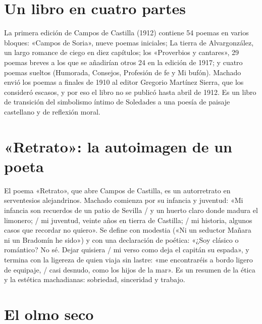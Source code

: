 \documentclass{book}
\begin{document}

\section{Un libro en cuatro partes}

La primera edición de Campos de Castilla (1912) contiene 54 poemas en varios bloques: «Campos de Soria», nueve poemas iniciales; La tierra de Alvargonzález, un largo romance de ciego en diez capítulos; los «Proverbios y cantares», 29 poemas breves a los que se añadirían otros 24 en la edición de 1917; y cuatro poemas sueltos (Humorada, Consejos, Profesión de fe y Mi bufón). Machado envió los poemas a finales de 1910 al editor Gregorio Martínez Sierra, que los consideró escasos, y por eso el libro no se publicó hasta abril de 1912. Es un libro de transición del simbolismo íntimo de Soledades a una poesía de paisaje castellano y de reflexión moral.


\section{«Retrato»: la autoimagen de un poeta}

El poema «Retrato», que abre Campos de Castilla, es un autorretrato en serventesios alejandrinos. Machado comienza por su infancia y juventud: «Mi infancia son recuerdos de un patio de Sevilla / y un huerto claro donde madura el limonero; / mi juventud, veinte años en tierra de Castilla; / mi historia, algunos casos que recordar no quiero». Se define con modestia («Ni un seductor Mañara ni un Bradomín he sido») y con una declaración de poética: «¿Soy clásico o romántico? No sé. Dejar quisiera / mi verso como deja el capitán su espada», y termina con la ligereza de quien viaja sin lastre: «me encontraréis a bordo ligero de equipaje, / casi desnudo, como los hijos de la mar». Es un resumen de la ética y la estética machadianas: sobriedad, sinceridad y trabajo.


\section{El olmo seco}
\end{document}
